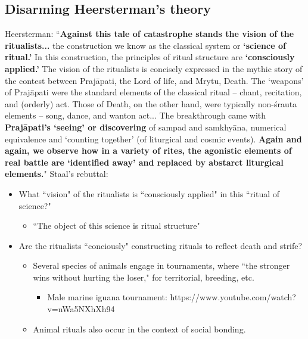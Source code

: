 \documentclass[12pt]{article}
\begin{document}
\subsection*{Disarming Heersterman's theory}
Heersterman: ``\textbf{Against this tale of catastrophe stands the vision of the ritualists...} 
the construction we know as the classical system or \textbf{`science of ritual.'}
In this construction, the principles of ritual structure are \textbf{`consciously applied.'}
The vision of the ritualists is concisely expressed in the mythic story of the contest between Praj\={a}pati, the Lord of life, and Mrytu, Death. 
The `weapons' of Praj\={a}pati were the standard elements of the classical ritual -- chant, recitation, and (orderly) act. 
Those of Death, on the other hand, were typically non-\'{s}rauta elements -- song, dance, and wanton act... 
The breakthrough came with \textbf{Praj\={a}pati's `seeing' or discovering} of sampad and samkhy\={a}na, numerical equivalence and `counting together' (of liturgical and cosmic events). 
\textbf{Again and again, we observe how in a variety of rites, the agonistic elements of real battle are `identified away' and replaced by abstarct liturgical elements.}"
\bigbreak
Staal's rebuttal:
\begin{itemize}
  \item What ``vision" of the ritualists is ``consciously applied" in this ``ritual of science?" 
      \begin{itemize}
        \item ``The object of this science is ritual structure" 
      \end{itemize}
    \item Are the ritualists ``conciously" constructing rituals to reflect death and strife? 
      \begin{itemize}
        \item Several species of animals engage in tournaments, where ``the stronger wins without hurting the loser," for territorial, breeding, etc.  
          \begin{itemize}
            \item Male marine iguana tournament: https://www.youtube.com/watch?v=nWa5NXhXh94 
          \end{itemize}
        \item Animal rituals also occur in the context of social bonding. 
      \end{itemize}
\end{itemize}
\end{document}
